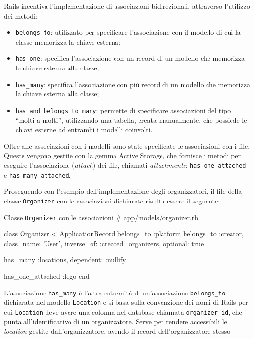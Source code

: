 Rails incentiva l'implementazione di associazioni bidirezionali, attraverso l'utilizzo dei metodi:
\begin{itemize}
	\item \verb|belongs_to|: utilizzato per specificare l'associazione con il modello di cui la classe memorizza la chiave esterna;
	\item \verb|has_one|: specifica l'associazione con un record di un modello che memorizza la chiave esterna alla classe;
	\item \verb|has_many|: specifica l'associazione con più record di un modello che memorizza la chiave esterna alla classe;
	\item \verb|has_and_belongs_to_many|: permette di specificare associazioni del tipo ``molti a molti'', utilizzando una tabella, creata manualmente, che possiede le chiavi esterne ad entrambi i modelli coinvolti.
\end{itemize}
Oltre alle associazioni con i modelli sono state specificate le associazioni con i file. Queste vengono gestite con la gemma Active Storage, che fornisce i metodi per eseguire l'associazione (\emph{attach}) dei file, chiamati \emph{attachments}: \verb|has_one_attached| e \verb|has_many_attached|.

Proseguendo con l'esempio dell'implementazione degli organizzatori, il file della classe \verb|Organizer| con le associazioni dichiarate risulta essere il seguente:

\begin{code}{Classe \texttt{Organizer} con le associazioni}
# app/models/organizer.rb

class Organizer < ApplicationRecord
  belongs_to :platform
  belongs_to :creator, class_name: 'User', inverse_of: :created_organizers, optional: true

  has_many :locations, dependent: :nullify

  has_one_attached :logo
end
\end{code}

\noindent L'associazione \verb|has_many| è l'altra estremità di un'associazione \verb|belongs_to| dichiarata nel modello \verb|Location| e si basa sulla convenzione dei nomi di Rails per cui \verb|Location| deve avere una colonna nel database chiamata \verb|organizer_id|, che punta all'identificativo di un organizzatore. Serve per rendere accessibili le \emph{location} gestite dall'organizzatore, avendo il record dell'organizzatore stesso.

